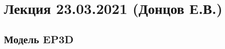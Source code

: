 \documentclass[main.tex]{subfiles}
\begin{document}

\section{Лекция 23.03.2021 (Донцов Е.В.)}

\subsection{Модель EP3D}
\end{document}
